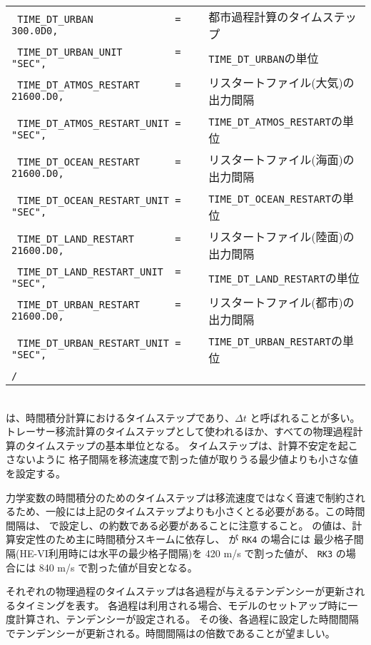 {{{\begin{tabularx}{140mm}{lX}
\verb| TIME_DT_URBAN              = 300.0D0,| & 都市過程計算のタイムステップ\\
\verb| TIME_DT_URBAN_UNIT         = "SEC",  | & \verb|TIME_DT_URBAN|の単位\\
\verb| TIME_DT_ATMOS_RESTART      = 21600.D0, | & リスタートファイル(大気)の出力間隔\\
\verb| TIME_DT_ATMOS_RESTART_UNIT = "SEC",    | & \verb|TIME_DT_ATMOS_RESTART|の単位\\
\verb| TIME_DT_OCEAN_RESTART      = 21600.D0, | & リスタートファイル(海面)の出力間隔\\
\verb| TIME_DT_OCEAN_RESTART_UNIT = "SEC",    | & \verb|TIME_DT_OCEAN_RESTART|の単位\\
\verb| TIME_DT_LAND_RESTART       = 21600.D0, | & リスタートファイル(陸面)の出力間隔\\
\verb| TIME_DT_LAND_RESTART_UNIT  = "SEC",    | & \verb|TIME_DT_LAND_RESTART|の単位\\
\verb| TIME_DT_URBAN_RESTART      = 21600.D0, | & リスタートファイル(都市)の出力間隔\\
\verb| TIME_DT_URBAN_RESTART_UNIT = "SEC",    | & \verb|TIME_DT_URBAN_RESTART|の単位\\
\verb|/|\\
\end{tabularx}
}}}\\


 は、時間積分計算におけるタイムステップであり、$\Delta t$ と呼ばれることが多い。
トレーサー移流計算のタイムステップとして使われるほか、すべての物理過程計算のタイムステップの基本単位となる。
タイムステップは、計算不安定を起こさないように
格子間隔を移流速度で割った値が取りうる最少値よりも小さな値を設定する。

力学変数の時間積分のためのタイムステップは移流速度ではなく音速で制約されるため、一般には上記のタイムステップよりも小さくとる必要がある。この時間間隔は、 で設定し、の約数である必要があることに注意すること。
の値は、計算安定性のため主に時間積分スキームに依存し、
 が \verb|RK4| の場合には
最少格子間隔(HE-VI利用時には水平の最少格子間隔)を 420 m/s で割った値が、
\verb|RK3| の場合には 840 m/s で割った値が目安となる。

それぞれの物理過程のタイムステップは各過程が与えるテンデンシーが更新されるタイミングを表す。
各過程は利用される場合、モデルのセットアップ時に一度計算され、テンデンシーが設定される。
その後、各過程に設定した時間間隔でテンデンシーが更新される。時間間隔はの倍数であることが望ましい。

